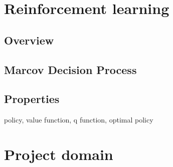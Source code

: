 \documentclass[12pt]{article}
\begin{document}

\tableofcontents
\pagebreak


\section{Reinforcement learning}{}
\subsection{Overview}
\subsection{Marcov Decision Process}
\subsection{Properties}{policy, value function, q function, optimal policy}
\newpage
\section{Project domain} 
\end{document}
